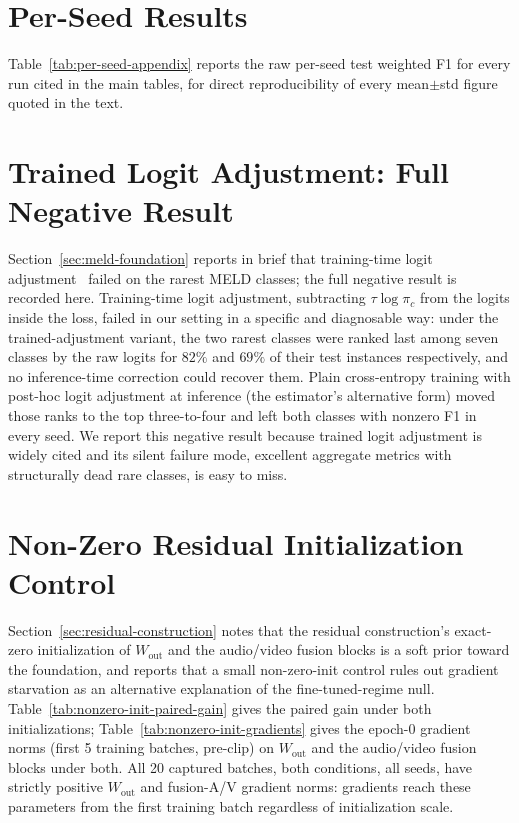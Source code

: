 \section{Per-Seed Results}
\label{sec:appendix-per-seed}

Table~\ref{tab:per-seed-appendix} reports the raw per-seed test weighted F1 for every run cited in the main tables, for direct reproducibility of every mean$\pm$std figure quoted in the text.



\section{Trained Logit Adjustment: Full Negative Result}
\label{sec:appendix-logit-adjustment}

Section~\ref{sec:meld-foundation} reports in brief that training-time logit adjustment~\cite{menon2021logitadjustment} failed on the rarest MELD classes; the full negative result is recorded here. Training-time logit adjustment, subtracting $\tau \log \pi_c$ from the logits inside the loss, failed in our setting in a specific and diagnosable way: under the trained-adjustment variant, the two rarest classes were ranked last among seven classes by the raw logits for $82\%$ and $69\%$ of their test instances respectively, and no inference-time correction could recover them. Plain cross-entropy training with post-hoc logit adjustment at inference (the estimator's alternative form) moved those ranks to the top three-to-four and left both classes with nonzero F1 in every seed. We report this negative result because trained logit adjustment is widely cited and its silent failure mode, excellent aggregate metrics with structurally dead rare classes, is easy to miss.

\section{Non-Zero Residual Initialization Control}
\label{sec:appendix-nonzero-init}

Section~\ref{sec:residual-construction} notes that the residual construction's exact-zero initialization of $W_{\text{out}}$ and the audio/video fusion blocks is a soft prior toward the foundation, and reports that a small non-zero-init control rules out gradient starvation as an alternative explanation of the fine-tuned-regime null. Table~\ref{tab:nonzero-init-paired-gain} gives the paired gain under both initializations; Table~\ref{tab:nonzero-init-gradients} gives the epoch-0 gradient norms (first 5 training batches, pre-clip) on $W_{\text{out}}$ and the audio/video fusion blocks under both. All 20 captured batches, both conditions, all seeds, have strictly positive $W_{\text{out}}$ and fusion-A/V gradient norms: gradients reach these parameters from the first training batch regardless of initialization scale.

